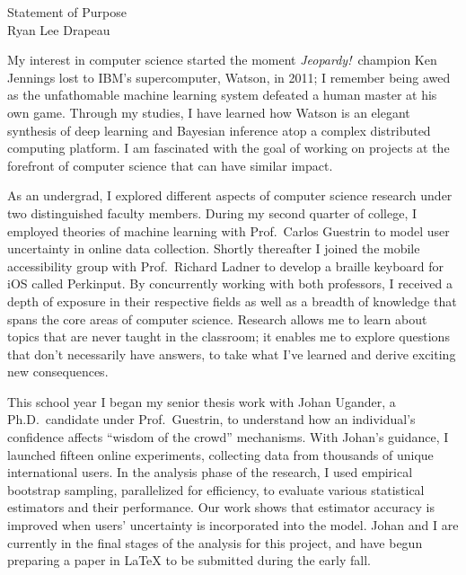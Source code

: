 \setlength{\oddsidemargin}{0in}
\setlength{\evensidemargin}{0in}
\setlength{\textwidth}{6.5in}
\setlength{\topmargin}{-.95in}
\setlength{\textheight}{9.75in}
\pagestyle{empty}



\begin{center}
    {\Large Statement of Purpose}\\[2 mm]
    {\large Ryan Lee Drapeau}
\end{center}

My interest in computer science started the moment {\it{Jeopardy!}}\ champion Ken Jennings lost to IBM's supercomputer, Watson, in 2011; I remember being awed as the unfathomable machine learning system defeated a human master at his own game. Through my studies, I have learned how Watson is an elegant synthesis of deep learning and Bayesian inference atop a complex distributed computing platform. I am fascinated with the goal of working on projects at the forefront of computer science that can have similar impact.\vspace{2 mm}

As an undergrad, I explored different aspects of computer science research under two distinguished faculty members. During my second quarter of college, I employed theories of machine learning with Prof.\ Carlos Guestrin to model user uncertainty in online data collection. Shortly thereafter I joined the mobile accessibility group with Prof.\ Richard Ladner to develop a braille keyboard for iOS called Perkinput. By concurrently working with both professors, I received a depth of exposure in their respective fields as well as a breadth of knowledge that spans the core areas of computer science. Research allows me to learn about topics that are never taught in the classroom; it enables me to explore questions that don't necessarily have answers, to take what I've learned and derive exciting new consequences.\vspace{2 mm}

This school year I began my senior thesis work with Johan Ugander, a Ph.D.\ candidate under Prof.\ Guestrin, to understand how an individual's confidence affects ``wisdom of the crowd'' mechanisms. With Johan's guidance, I launched fifteen online experiments, collecting data from thousands of unique international users. In the analysis phase of the research, I used empirical bootstrap sampling, parallelized for efficiency, to evaluate various statistical estimators and their performance. Our work shows that estimator accuracy is improved when users' uncertainty is incorporated into the model. Johan and I are currently in the final stages of the analysis for this project, and have begun preparing a paper in \LaTeX{} to be submitted during the early fall.\vspace{2 mm}

